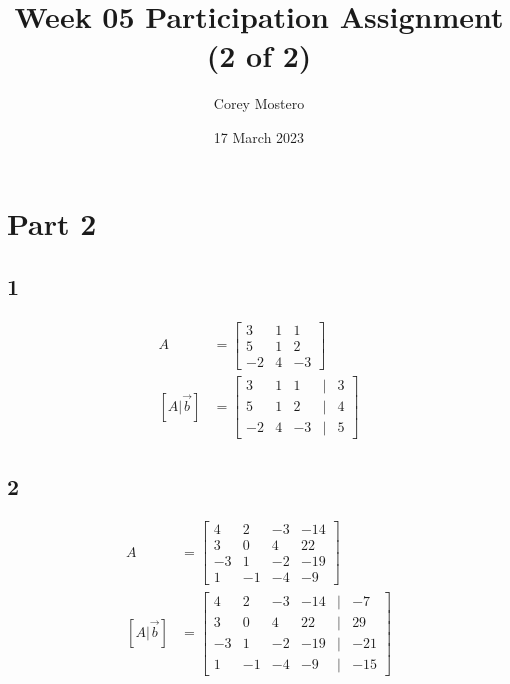 \documentclass{article}
\title{Week 05 Participation Assignment (2 of 2)}
\date{17 March 2023}
\author{Corey Mostero}
\begin{document}
\newcommand{\hr}{\par\noindent\rule{\textwidth}{0.4pt}}

\newcommand{\bc}[1]{
	\begin{equation*}
		\begin{boxed}
			{#1}
		\end{boxed}
	\end{equation*}
}

\newcommand{\cond}[2]{
	\ifmmode
		{#1} \quad {#2}
	\else
		$$ {#1} \quad {#2} $$
	\fi
}

\maketitle
\newpage

\tableofcontents

\section{Part 2}

\subsection{1}
\begin{align*}
	A & =
		\begin{bmatrix}
			3 & 1 & 1 \\
			5 & 1 & 2 \\
			-2 & 4 & -3
		\end{bmatrix} \\
	[A | \vec{b}] & =
		\begin{bmatrix}
			3 & 1 & 1 & | & 3 \\
			5 & 1 & 2 & | & 4 \\
			-2 & 4 & -3 & | & 5
		\end{bmatrix}
\end{align*}

\subsection{2}
\begin{align*}
	A & =
		\begin{bmatrix}
			4 & 2 & -3 & -14 \\
			3 & 0 & 4 & 22 \\
			-3 & 1 & -2 & -19 \\
			1 & -1 & -4 & -9
		\end{bmatrix} \\
	[A | \vec{b}] & =
		\begin{bmatrix}
			4 & 2 & -3 & -14 & | & -7 \\
			3 & 0 & 4 & 22 & | & 29 \\
			-3 & 1 & -2 & -19 & | & -21 \\
			1 & -1 & -4 & -9 & | & -15
		\end{bmatrix}
\end{align*}
\end{document}
